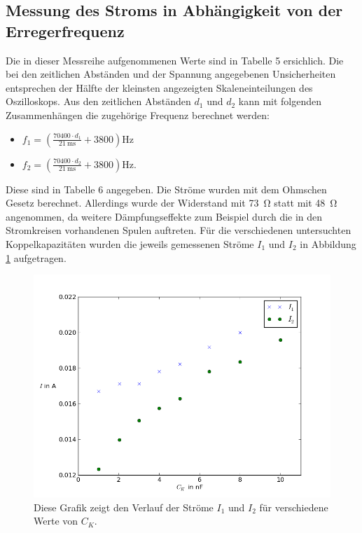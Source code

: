 \documentclass[11pt,ngerman,a4paper]{article}
\begin{document}
\subsection{Messung des Stroms in Abhängigkeit von der Erregerfrequenz}
Die in dieser Messreihe aufgenommenen Werte sind in Tabelle 5 ersichlich.
Die bei den zeitlichen Abständen und der Spannung angegebenen Unsicherheiten entsprechen der Hälfte der kleinsten angezeigten Skaleneinteilungen des Oszilloskops. Aus den zeitlichen Abständen $d_1$ und $d_2$ kann mit folgenden Zusammenhängen die zugehörige Frequenz berechnet werden:
\begin{itemize}
\item $f_1 = \left( \frac{70400\cdot d_1}{\SI{21}{\milli\second}}+3800 \right)\si{\Hz}$
\item $f_2 = \left( \frac{70400\cdot d_2}{\SI{21}{\milli\second}}+3800\right)\si{\Hz}$.
\end{itemize}
Diese sind in Tabelle 6 angegeben. Die Ströme wurden mit dem Ohmschen Gesetz berechnet. Allerdings wurde der Widerstand mit \SI{73}{\ohm}  statt mit \SI{48}{\ohm} angenommen, da weitere Dämpfungseffekte zum Beispiel durch die in den Stromkreisen vorhandenen Spulen auftreten. Für die verschiedenen untersuchten Koppelkapazitäten wurden die jeweils gemessenen Ströme $I_1$ und $I_2$ in Abbildung \ref{44} aufgetragen.
\begin{figure}[h]
\centering
\includegraphics[scale=0.6]{Abb/diag4.png}
\caption{Diese Grafik zeigt den Verlauf der Ströme $I_1$ und $I_2$ für verschiedene Werte von $C_K$.}
\label{44}
\end{figure}
\end{document}
